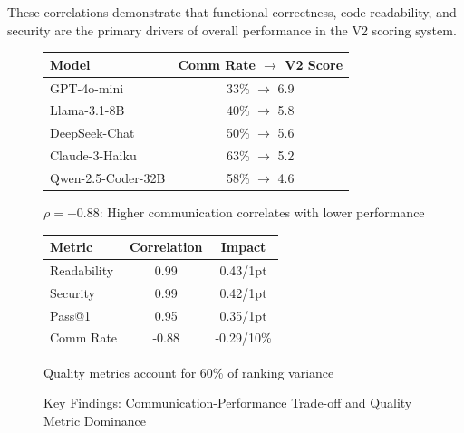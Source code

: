 \documentclass[conference]{IEEEtran}
\begin{document}
These correlations demonstrate that functional correctness, code readability, and security are the primary drivers of overall performance in the V2 scoring system.

\begin{figure}[ht]
    \centering
    \begin{minipage}{0.45\textwidth}
        \centering
        \caption{Communication Rate vs V2 Score Trade-off}
        \label{fig:comm_tradeoff}
        \begin{tabular}{lc}
            \toprule
            Model & Comm Rate $\rightarrow$ V2 Score \\
            \midrule
            GPT-4o-mini & 33\% $\rightarrow$ 6.9 \\
            Llama-3.1-8B & 40\% $\rightarrow$ 5.8 \\
            DeepSeek-Chat & 50\% $\rightarrow$ 5.6 \\
            Claude-3-Haiku & 63\% $\rightarrow$ 5.2 \\
            Qwen-2.5-Coder-32B & 58\% $\rightarrow$ 4.6 \\
            \bottomrule
        \end{tabular}
        \vspace{0.5em}
        {\small $\rho = -0.88$: Higher communication correlates with lower performance}
    \end{minipage}
    \hfill
    \begin{minipage}{0.45\textwidth}
        \centering
        \caption{Code Quality Dominance in Rankings}
        \label{fig:quality_dominance}
        \begin{tabular}{lcc}
            \toprule
            Metric & Correlation & Impact \\
            \midrule
            Readability & 0.99 & 0.43/1pt \\
            Security & 0.99 & 0.42/1pt \\
            Pass@1 & 0.95 & 0.35/1pt \\
            Comm Rate & -0.88 & -0.29/10\% \\
            \bottomrule
        \end{tabular}
        \vspace{0.5em}
        {\small Quality metrics account for 60\% of ranking variance}
    \end{minipage}
    \caption{Key Findings: Communication-Performance Trade-off and Quality Metric Dominance}
    \label{fig:key_findings}
\end{figure}
\end{document}
